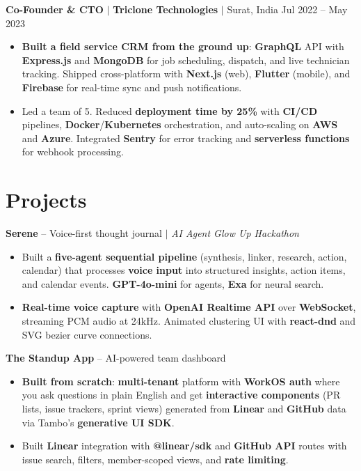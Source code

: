 \documentclass[10pt,a4paper]{article}
\begin{document}
\vspace{1pt}
\textbf{Co-Founder \& CTO} $|$ \textbf{Triclone Technologies} $|$ Surat, India \hfill Jul 2022 -- May 2023
\begin{itemize}
    \item \textbf{Built a field service CRM from the ground up}: \textbf{GraphQL} API with \textbf{Express.js} and \textbf{MongoDB} for job scheduling, dispatch, and live technician tracking. Shipped cross-platform with \textbf{Next.js} (web), \textbf{Flutter} (mobile), and \textbf{Firebase} for real-time sync and push notifications.
    \item Led a team of 5. Reduced \textbf{deployment time by 25\%} with \textbf{CI/CD} pipelines, \textbf{Docker}/\textbf{Kubernetes} orchestration, and auto-scaling on \textbf{AWS} and \textbf{Azure}. Integrated \textbf{Sentry} for error tracking and \textbf{serverless functions} for webhook processing.
\end{itemize}

\section{Projects}

\textbf{Serene} -- Voice-first thought journal $|$ \textit{AI Agent Glow Up Hackathon}
\begin{itemize}
    \item Built a \textbf{five-agent sequential pipeline} (synthesis, linker, research, action, calendar) that processes \textbf{voice input} into structured insights, action items, and calendar events. \textbf{GPT-4o-mini} for agents, \textbf{Exa} for neural search.
    \item \textbf{Real-time voice capture} with \textbf{OpenAI Realtime API} over \textbf{WebSocket}, streaming PCM audio at 24kHz. Animated clustering UI with \textbf{react-dnd} and SVG bezier curve connections.
\end{itemize}

\textbf{The Standup App} -- AI-powered team dashboard
\begin{itemize}
    \item \textbf{Built from scratch}: \textbf{multi-tenant} platform with \textbf{WorkOS auth} where you ask questions in plain English and get \textbf{interactive components} (PR lists, issue trackers, sprint views) generated from \textbf{Linear} and \textbf{GitHub} data via Tambo's \textbf{generative UI SDK}.
    \item Built \textbf{Linear} integration with \textbf{@linear/sdk} and \textbf{GitHub API} routes with issue search, filters, member-scoped views, and \textbf{rate limiting}.
\end{itemize}
\end{document}
